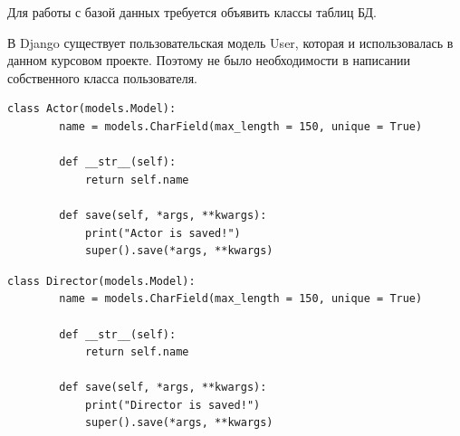 \documentclass[a4paper, 14pt]{article}
\begin{document}
	Для работы с базой данных требуется объявить классы таблиц БД.
	
	В Django существует пользовательская модель User, которая и использовалась в данном курсовом проекте. Поэтому не было необходимости в написании собственного класса пользователя.
	
    
	\begin{lstlisting}[label=some-code,caption=Класс <<Актер>>]
	class Actor(models.Model):
		name = models.CharField(max_length = 150, unique = True)
		
		def __str__(self):
			return self.name
		
		def save(self, *args, **kwargs):
			print("Actor is saved!")
			super().save(*args, **kwargs)
	\end{lstlisting}
	
	\begin{lstlisting}[label=some-code,caption=Класс <<Режиссер>>]
	class Director(models.Model):
		name = models.CharField(max_length = 150, unique = True)
		
		def __str__(self):
			return self.name
		
		def save(self, *args, **kwargs):
			print("Director is saved!")
			super().save(*args, **kwargs)
	\end{lstlisting}
	
\end{document}
